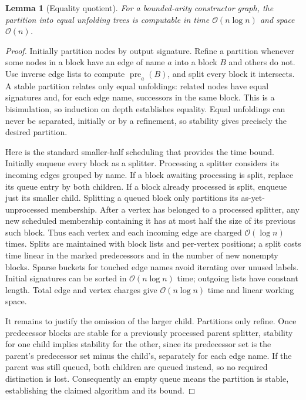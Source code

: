 \documentclass[11pt,letterpaper]{article}
\newtheorem{lemma}[theorem]{Lemma}
\theoremstyle{definition}\newtheorem{definition}[theorem]{Definition}
\newcommand{\Oh}{\mathcal O}
\begin{document}
\begin{lemma}[Equality quotient]\label{lem:min}
For a bounded-arity constructor graph, the partition into equal unfolding trees is computable in time $\Oh(n\log n)$ and space $\Oh(n)$.
\end{lemma}
\begin{proof}
Initially partition nodes by output signature. Refine a partition whenever some nodes in a block have an edge of name $a$ into a block $B$ and others do not. Use inverse edge lists to compute $\operatorname{pre}_a(B)$, and split every block it intersects. A stable partition relates only equal unfoldings: related nodes have equal signatures and, for each edge name, successors in the same block. This is a bisimulation, so induction on depth establishes equality. Equal unfoldings can never be separated, initially or by a refinement, so stability gives precisely the desired partition.

Here is the standard smaller-half scheduling that provides the time bound. Initially enqueue every block as a splitter. Processing a splitter considers its incoming edges grouped by name. If a block awaiting processing is split, replace its queue entry by both children. If a block already processed is split, enqueue just its smaller child. Splitting a queued block only partitions its as-yet-unprocessed membership. After a vertex has belonged to a processed splitter, any new scheduled membership containing it has at most half the size of its previous such block. Thus each vertex and each incoming edge are charged $\Oh(\log n)$ times. Splits are maintained with block lists and per-vertex positions; a split costs time linear in the marked predecessors and in the number of new nonempty blocks. Sparse buckets for touched edge names avoid iterating over unused labels. Initial signatures can be sorted in $\Oh(n\log n)$ time; outgoing lists have constant length. Total edge and vertex charges give $\Oh(n\log n)$ time and linear working space.

It remains to justify the omission of the larger child. Partitions only refine. Once predecessor blocks are stable for a previously processed parent splitter, stability for one child implies stability for the other, since its predecessor set is the parent's predecessor set minus the child's, separately for each edge name. If the parent was still queued, both children are queued instead, so no required distinction is lost. Consequently an empty queue means the partition is stable, establishing the claimed algorithm and its bound.
\end{proof}
\end{document}
